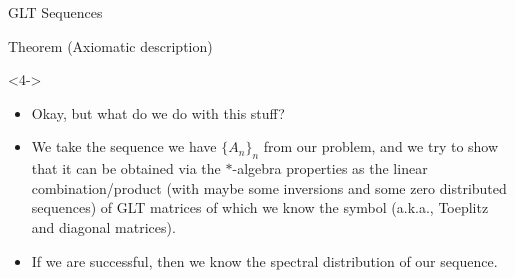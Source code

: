 \documentclass[aspectratio=169,xcolor=dvipsnames]{beamer}
\begin{document}
\begin{frame}{GLT Sequences}
\begin{onlyenv}
\begin{alertblock}{Theorem (Axiomatic description) \parencite{MR3674485,MR3887576}}
{\begin{enumerate}
\end{enumerate}
}
\end{alertblock}
\end{onlyenv}
\begin{onlyenv}<4->
\begin{itemize}
	\item[\faQuestionCircle]<5-> Okay, but what do we do with this stuff?
	\item[\faHammer]<6-> We take the sequence we have $\{A_n\}_n$ from our problem, and we try to show that it can be obtained via the $*$-algebra properties as the linear combination/product (with maybe some inversions and some zero distributed sequences) of GLT matrices of which we know the symbol (a.k.a., Toeplitz and diagonal matrices). 
	\item[\faMagic]<7-> If we are successful, then we \alert{know the spectral distribution of our sequence}. 
\end{itemize}
\end{onlyenv}
\end{frame}
\end{document}
